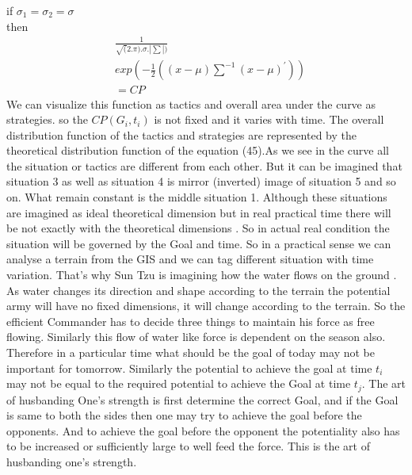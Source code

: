 \documentclass[]{article}
\begin{document}
if $\sigma_1=\sigma_2=\sigma$\\
then\\
\begin{equation}
\begin{split}
  &\frac{1}{\sqrt(2.\pi).\sigma.|\sum|)}\\&exp(-\frac{1}{2}((x-\mu){{\sum^{-1}}}(x-\mu)^{'} ))\\&=CP  
\end{split} 
\end{equation}
We can visualize this function as tactics and overall area under the curve as strategies. so the $CP(G_i,t_i)$ is not fixed and it varies with time. The overall distribution function of the tactics and strategies are represented by the theoretical distribution function of the equation (45).As we see in the curve all the situation or tactics are different from each other. But it can be imagined that situation 3 as well as situation 4 is mirror (inverted) image of situation 5 and so on. What remain constant is the middle situation 1. Although these situations are imagined as ideal theoretical dimension but in real practical time there will be not exactly with the theoretical dimensions . So in actual real condition the situation will be governed by the Goal and time. So in a practical sense we can analyse a terrain from the GIS and we can tag different situation with time variation. That's why Sun Tzu is imagining how the water flows on the ground . As water changes its direction and shape according to the terrain the potential army will have no fixed dimensions, it will change according to the terrain. So the efficient Commander has to decide three things to maintain his force as free flowing. 
Similarly this flow of water like force is dependent on the season also. Therefore in a particular time what should be the goal of today may not be important for tomorrow. Similarly the potential to achieve the goal at time $t_i$ may not be equal to the required potential to achieve the Goal at time $t_j$. The art of husbanding One's strength is first determine the correct Goal, and if the Goal is same to both the sides then one may try to achieve the goal before the opponents. And to achieve the goal before the opponent the potentiality also has to be increased or sufficiently large to well feed the force. This is the art of husbanding one's strength.
\end{document}

